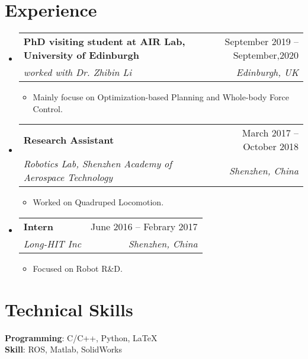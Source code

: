 \documentclass[letterpaper,11pt]{article}
\makeatletter
\newcommand{\resumeItem}[1]{
  \item\small{
    {#1 \vspace{-2pt}}
  }
}
\newcommand{\resumeSubheading}[4]{
  \vspace{-2pt}\item
    \begin{tabular*}{0.97\textwidth}[t]{l@{\extracolsep{\fill}}r}
      \textbf{#1} & #2 \\
      \textit{#3} & \textit{\small #4} \\
    \end{tabular*}\vspace{-7pt}
}
\newcommand{\resumeSubHeadingListStart}{\begin{itemize}[leftmargin=0.15in, label={}]}
\newcommand{\resumeSubHeadingListEnd}{\end{itemize}}
\newcommand{\resumeItemListStart}{\begin{itemize}}
\newcommand{\resumeItemListEnd}{\end{itemize}\vspace{-5pt}}
\makeatother
\begin{document}
\vspace{-7mm}
\section{Experience}
  \resumeSubHeadingListStart

    \resumeSubheading
      {PhD visiting student at AIR Lab, University of Edinburgh}{September 2019 -- September,2020}
      {worked with Dr. Zhibin Li}{Edinburgh, UK}
      \resumeItemListStart
        \resumeItem{Mainly focuse on Optimization-based Planning and Whole-body Force Control.}
      \resumeItemListEnd
      
    \resumeSubheading
      {Research Assistant}{March 2017 -- October 2018}
      {Robotics Lab,  Shenzhen Academy of Aerospace Technology}{Shenzhen, China}
      \resumeItemListStart
        \resumeItem{Worked on Quadruped Locomotion.}
    \resumeItemListEnd

    \resumeSubheading
      {Intern}{June 2016 -- Febrary 2017}
      { Long-HIT Inc}{Shenzhen, China}
      \resumeItemListStart
        \resumeItem{Focused on Robot R\&D.}
      \resumeItemListEnd
  \resumeSubHeadingListEnd

\vspace{-7mm}
\section{Technical Skills}
 \begin{itemize}[leftmargin=0.15in, label={}]
    \small{\item{
     \textbf{Programming}{: C/C++, Python, \LaTeX} \\
     \textbf{Skill}{: ROS, Matlab, SolidWorks} 
    }}
 \end{itemize}


\end{document}
